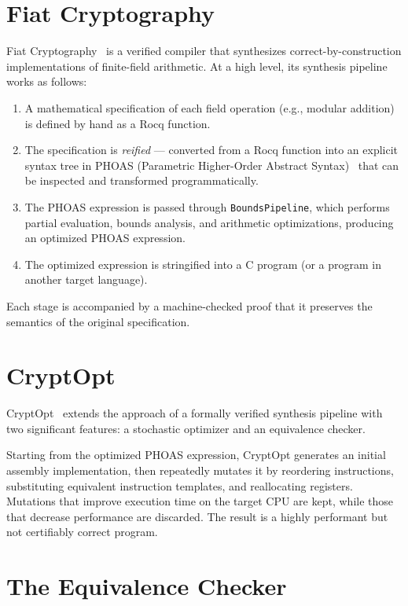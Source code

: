 \section{Fiat Cryptography}
\label{sec:fiat-crypto}
Fiat Cryptography~\autocite{fiatcrypto2019} is a verified compiler that synthesizes correct-by-construction implementations of finite-field arithmetic.
At a high level, its synthesis pipeline works as follows:
\begin{enumerate}
    \item A mathematical specification of each field operation (e.g., modular addition) is defined by hand as a Rocq function.
    \item The specification is \textit{reified} --- converted from a Rocq function into an explicit syntax tree in PHOAS (Parametric Higher-Order Abstract Syntax)~\autocite{phoas2008} that can be inspected and transformed programmatically.
    \item The PHOAS expression is passed through \texttt{BoundsPipeline}, which performs partial evaluation, bounds analysis, and arithmetic optimizations, producing an optimized PHOAS expression.
    \item The optimized expression is stringified into a C program (or a program in another target language).
\end{enumerate}
Each stage is accompanied by a machine-checked proof that it preserves the semantics of the original specification.


\section{CryptOpt}
\label{sec:cryptopt}
CryptOpt~\autocite{cryptopt2023} extends the approach of a formally verified synthesis pipeline with two significant features: a stochastic optimizer and an equivalence checker.

Starting from the optimized PHOAS expression, CryptOpt generates an initial assembly implementation, then repeatedly mutates it by reordering instructions, substituting equivalent instruction templates, and reallocating registers. Mutations that improve execution time on the target CPU are kept, while those that decrease performance are discarded. The result is a highly performant but not certifiably correct program.

\section{The Equivalence Checker}
\label{sec:equiv-checker}

